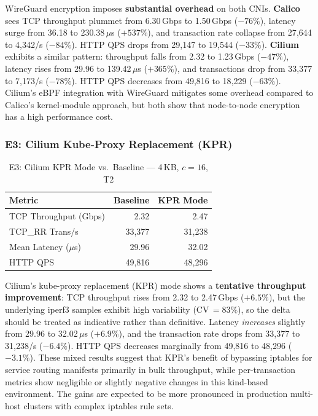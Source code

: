 \documentclass[11pt,a4paper]{article}
\begin{document}
\begin{findingbox}
WireGuard encryption imposes \textbf{substantial overhead} on both CNIs. \textbf{Calico} sees TCP throughput plummet from 6.30\,Gbps to 1.50\,Gbps ($-76\%$), latency surge from 36.18 to 230.38\,$\mu$s ($+537\%$), and transaction rate collapse from 27{,}644 to 4{,}342/s ($-84\%$). HTTP QPS drops from 29{,}147 to 19{,}544 ($-33\%$). \textbf{Cilium} exhibits a similar pattern: throughput falls from 2.32 to 1.23\,Gbps ($-47\%$), latency rises from 29.96 to 139.42\,$\mu$s ($+365\%$), and transactions drop from 33{,}377 to 7{,}173/s ($-78\%$). HTTP QPS decreases from 49{,}816 to 18{,}229 ($-63\%$). Cilium's eBPF integration with WireGuard mitigates some overhead compared to Calico's kernel-module approach, but both show that node-to-node encryption has a high performance cost.
\end{findingbox}

\subsubsection{E3: Cilium Kube-Proxy Replacement (KPR)}

\begin{table}[H]
\centering
\caption{E3: Cilium KPR Mode vs.\ Baseline --- 4\,KB, $c=16$, T2}
\begin{tabular}{lrr}
  \toprule
  \textbf{Metric} & \textbf{Baseline} & \textbf{KPR Mode} \\
  \midrule
  TCP Throughput (Gbps) & 2.32 & 2.47 \\
  TCP\_RR Trans/s & 33{,}377 & 31{,}238 \\
  Mean Latency ($\mu$s) & 29.96 & 32.02 \\
  HTTP QPS & 49{,}816 & 48{,}296 \\
  \bottomrule
\end{tabular}
\label{tab:kc-kpr}
\end{table}

\begin{findingbox}
Cilium's kube-proxy replacement (KPR) mode shows a \textbf{tentative throughput improvement}: TCP throughput rises from 2.32 to 2.47\,Gbps ($+6.5\%$), but the underlying iperf3 samples exhibit high variability (CV\,$=83\%$), so the delta should be treated as indicative rather than definitive. Latency \emph{increases} slightly from 29.96 to 32.02\,$\mu$s ($+6.9\%$), and the transaction rate drops from 33{,}377 to 31{,}238/s ($-6.4\%$). HTTP QPS decreases marginally from 49{,}816 to 48{,}296 ($-3.1\%$). These mixed results suggest that KPR's benefit of bypassing iptables for service routing manifests primarily in bulk throughput, while per-transaction metrics show negligible or slightly negative changes in this kind-based environment. The gains are expected to be more pronounced in production multi-host clusters with complex iptables rule sets.
\end{findingbox}
\end{document}
